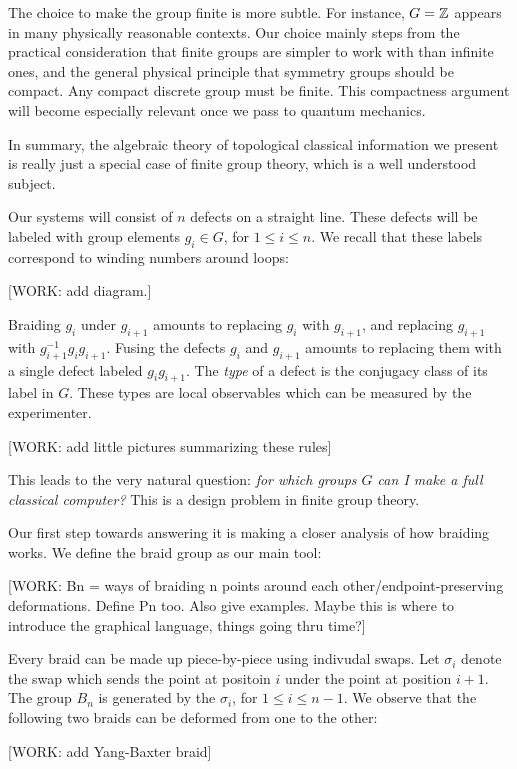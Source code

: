 The choice to make the group finite is more subtle. For instance, $G=\mathbb{Z}$ appears in many physically reasonable contexts. Our choice mainly steps from the practical consideration that finite groups are simpler to work with than infinite ones, and the general physical principle that symmetry groups should be compact. Any compact discrete group must be finite. This compactness argument will become especially relevant once we pass to quantum mechanics.

In summary, the algebraic theory of topological classical information we present is really just a special case of finite group theory, which is a well understood subject.

Our systems will consist of $n$ defects on a straight line. These defects will be labeled with group elements $g_i\in G$, for $1\leq i \leq n$. We recall that these labels correspond to winding numbers around loops:

[WORK: add diagram.]

Braiding $g_i$ under $g_{i+1}$ amounts to replacing $g_i$ with $g_{i+1}$, and replacing $g_{i+1}$ with $g_{i+1}^{-1}g_i g_{i+1}$. Fusing the defects $g_{i}$ and $g_{i+1}$ amounts to replacing them with a single defect labeled $g_{i}g_{i+1}$. The \textit{type} of a defect is the conjugacy class of its label in $G$. These types are local observables which can be measured by the experimenter.


[WORK: add little pictures summarizing these rules]

This leads to the very natural question: \textit{for which groups $G$ can I make a full classical computer?} This is a design problem in finite group theory.

Our first step towards answering it is making a closer analysis of how braiding works. We define the braid group as our main tool:

[WORK: Bn = ways of braiding n points around each other/endpoint-preserving deformations. Define Pn too. Also give examples. Maybe this is where to introduce the graphical language, things going thru time?]

Every braid can be made up piece-by-piece using indivudal swaps. Let $\sigma_{i}$ denote the swap which sends the point at positoin $i$ under the point at position $i+1$. The group $B_n$ is generated by the $\sigma_i$, for $1\leq i \leq n-1$. We observe that the following two braids can be deformed from one to the other:

[WORK: add Yang-Baxter braid]

